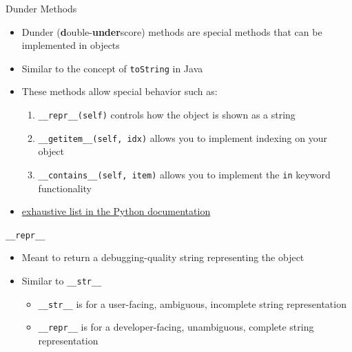 \documentclass[aspectratio=169,xcolor=dvipsnames]{beamer}
\begin{document}
\begin{frame}{Dunder Methods}
  \begin{itemize}
    \item Dunder (\textbf{d}ouble-\textbf{under}score) methods are special methods that can be implemented in objects
    \item Similar to the concept of \texttt{toString} in Java
    \item These methods allow special behavior such as:
      \begin{enumerate}
        \item \texttt{\_\_repr\_\_(self)} controls how the object is shown as a string
        \item \texttt{\_\_getitem\_\_(self, idx)} allows you to implement indexing on your object
        \item \texttt{\_\_contains\_\_(self, item)} allows you to implement the \texttt{in} keyword functionality
      \end{enumerate}
    \item \href{https://docs.python.org/3/reference/datamodel.html\#special-methods}{exhaustive list in the Python documentation}
  \end{itemize}
\end{frame}


\begin{frame}{\texttt{\_\_repr\_\_}}
  \begin{itemize}
    \item Meant to return a debugging-quality string representing the object
    \item Similar to \texttt{\_\_str\_\_}
    \begin{itemize}
      \item \texttt{\_\_str\_\_} is for a user-facing, ambiguous, incomplete string representation
      \item \texttt{\_\_repr\_\_} is for a developer-facing, unambiguous, complete string representation
    \end{itemize}
  \end{itemize}
  \begin{example}
    
  \end{example}
\end{frame}

\end{document}
